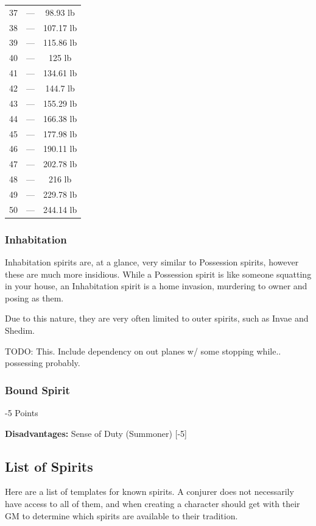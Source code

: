 \begin{multicols*}{3}
\begin{center}
\begin{tabular}{|c|c|c|}
			37 & — & 98.93 lb \\
			38 & — & 107.17 lb \\
			39 & — & 115.86 lb \\
			40 & — & 125 lb \\
			41 & — & 134.61 lb \\
			42 & — & 144.7 lb \\
			43 & — & 155.29 lb \\
			44 & — & 166.38 lb \\
			45 & — & 177.98 lb \\
			46 & — & 190.11 lb \\
			47 & — & 202.78 lb \\
			48 & — & 216 lb \\
			49 & — & 229.78 lb \\
			50 & — & 244.14 lb \\
			\hline
		\end{tabular}
	\end{center}
	
	\subsubsection*{Inhabitation}
	
	Inhabitation spirits are, at a glance, very similar to Possession spirits, however these are much more insidious. While a Possession spirit is like someone squatting in your house, an Inhabitation spirit is a home invasion, murdering to owner and posing as them.
	
	Due to this nature, they are very often limited to outer spirits, such as Invae and Shedim.
	
	TODO: This. Include dependency on out planes w/ some stopping while.. possessing probably.
	
	\subsubsection*{Bound Spirit}
	\begin{flushright}
		-5 Points
	\end{flushright}
	
	\textbf{Disadvantages:} Sense of Duty (Summoner) [-5]
	
	
	\subsection{List of Spirits}
	
	Here are a list of templates for known spirits. A conjurer does not necessarily have access to all of them, and when creating a character should get with their GM to determine which spirits are available to their tradition.
	

\end{multicols*}
